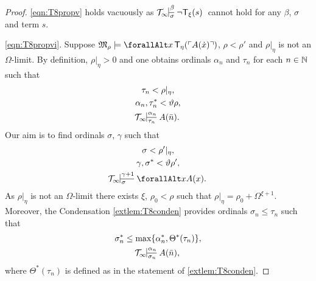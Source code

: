 \documentclass[UKenglish,cleveref,DIV=12]{scrartcl}
\let\forall\forallAlt
\theoremstyle{definition}
\theoremstyle{definition}
\begin{document}
\begin{proof}
\ref{eqn:T8propv} holds vacuously as $\Tinfty\prov\beta\sigma{\lnot\T_\xi(s)}$ cannot hold for any $\beta$, $\sigma$ and term $s$.

\ref{eqn:T8propvi}. Suppose $\mathfrak M_\rho\models \forall x\, \T_\eta(\gn{A(\dot x)})$, $\rho<\rho'$ and $\rho|_\eta$ is not an $\Omega$-limit. By definition, $\rho|_\eta>0$ and one obtains ordinals $\alpha_n$ and $\tau_n$ for each $n\in \mathbb N$ such that
\begin{gather*}
  \tau_n<\rho|_\eta,\\
  \alpha_n,\tau_n^* <\vartheta\rho,\\
  \Tinfty\prov{\alpha_n}{\tau_n}{A(\bar n).}
\end{gather*}
Our aim is to find ordinals $\sigma$, $\gamma$ such that
\begin{gather}
  \sigma<\rho'|_\eta,\label{eqn:T8Mprop4}\\
  \gamma,\sigma^*<\vartheta\rho',\label{eqn:T8Mprop5}\\
  \Tinfty\prov{\gamma+1}\sigma{\forall xA(x).}\label{eqn:T8Mprop6}
\end{gather}
%
%
As $\rho|_\eta$ is not an $\Omega$-limit there exists $\xi$, $\rho_0<\rho$ such
that $\rho|_\eta=\rho_0+\Omega^{\xi+1}$. Moreover, the Condensation \cref{extlem:T8conden} provides ordinals
$\sigma_n\le\tau_n$ such that
\begin{gather}\label{eqn:T8Mprop3}
  \sigma_n^*\le\max\{\alpha_n^*,\Theta^*(\tau_n)\},\\
  \Tinfty\prov{\alpha_n}{\sigma_n}{A(\bar n),}\label{eqn:T8Mprop2}
\end{gather}
where $\Theta^*(\tau_n)$ is defined as in the statement of \cref{extlem:T8conden}.

\end{proof}
\end{document}
